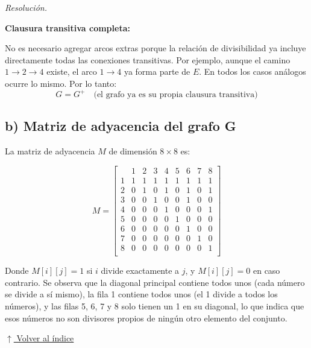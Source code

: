 \documentclass[12pt]{article}
\theoremstyle{definition}
\theoremstyle{remark}
\newenvironment{resolucion}{%
    \par\vspace{0.3em}%
    \noindent\textit{Resolución.}\quad
}{%
    \par\vspace{0.8em}%
}
\newcommand{\volverindice}{%
    \vspace{1em}%
    \begin{flushright}%
        \hyperlink{indice}{\small $\uparrow$ Volver al índice}%
    \end{flushright}%
}
\begin{document}
\begin{resolucion}
\newpage
\textbf{Clausura transitiva completa:}

No es necesario agregar arcos extras porque la relación de divisibilidad ya incluye directamente todas las conexiones transitivas. Por ejemplo, aunque el camino $1 \to 2 \to 4$ existe, el arco $1 \to 4$ ya forma parte de $E$. En todos los casos análogos ocurre lo mismo. Por lo tanto:
\[G = G^+ \quad \text{(el grafo ya es su propia clausura transitiva)}\]

\subsection*{b) Matriz de adyacencia del grafo G}

La matriz de adyacencia $M$ de dimensión $8 \times 8$ es:

\[
M = \begin{bmatrix}
    & 1 & 2 & 3 & 4 & 5 & 6 & 7 & 8 \\
1   & 1 & 1 & 1 & 1 & 1 & 1 & 1 & 1 \\
2   & 0 & 1 & 0 & 1 & 0 & 1 & 0 & 1 \\
3   & 0 & 0 & 1 & 0 & 0 & 1 & 0 & 0 \\
4   & 0 & 0 & 0 & 1 & 0 & 0 & 0 & 1 \\
5   & 0 & 0 & 0 & 0 & 1 & 0 & 0 & 0 \\
6   & 0 & 0 & 0 & 0 & 0 & 1 & 0 & 0 \\
7   & 0 & 0 & 0 & 0 & 0 & 0 & 1 & 0 \\
8   & 0 & 0 & 0 & 0 & 0 & 0 & 0 & 1 \\
\end{bmatrix}
\]

Donde $M[i][j] = 1$ si $i$ divide exactamente a $j$, y $M[i][j] = 0$ en caso contrario. Se observa que la diagonal principal contiene todos unos (cada número se divide a sí mismo), la fila 1 contiene todos unos (el 1 divide a todos los números), y las filas 5, 6, 7 y 8 solo tienen un 1 en su diagonal, lo que indica que esos números no son divisores propios de ningún otro elemento del conjunto.

\end{resolucion}

\volverindice
\newpage

\end{document}
